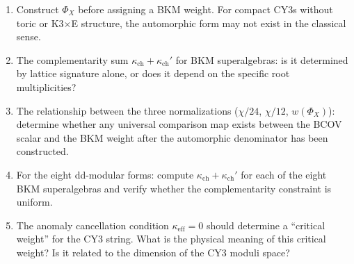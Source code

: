 \documentclass[11pt]{article}
\theoremstyle{definition}
\theoremstyle{remark}
\begin{document}
\begin{enumerate}
\item Construct $\Phi_X$ before assigning a BKM weight. For compact CY3s
 without toric or K3$\times$E structure, the automorphic form may not
 exist in the classical sense.

\item The complementarity sum $\kappa_{\mathrm{ch}} + \kappa_{\mathrm{ch}}'$ for BKM superalgebras:
 is it determined by lattice signature alone, or does it depend on the
 specific root multiplicities?

\item The relationship between the three normalizations
 ($\chi/24$, $\chi/12$, $w(\Phi_X)$): determine whether any universal
 comparison map exists between the BCOV scalar and the BKM weight after
 the automorphic denominator has been constructed.

\item For the eight dd-modular forms: compute $\kappa_{\mathrm{ch}} + \kappa_{\mathrm{ch}}'$ for
 each of the eight BKM superalgebras and verify whether the
 complementarity constraint is uniform.

\item The anomaly cancellation condition $\kappa_{\mathrm{eff}} = 0$
 should determine a ``critical weight'' for the CY3 string. What is
 the physical meaning of this critical weight? Is it related to the
 dimension of the CY3 moduli space?
\end{enumerate}
\end{document}
